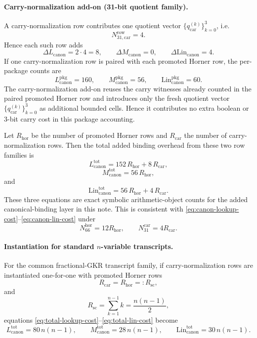 ﻿\documentclass[11pt]{article}
\begin{document}
\paragraph{Carry-normalization add-on (31-bit quotient family).}
A carry-normalization row contributes one quotient vector
\(\{q_{\mathrm{car}}^{(k)}\}_{k=0}^3\), i.e.
\[
N_{31,\mathrm{car}}^{\mathrm{row}}=4.
\]
Hence each such row adds
\[
\Delta L_{\mathrm{canon}}=2\cdot 4=8,\qquad
\Delta M_{\mathrm{canon}}=0,\qquad
\Delta \mathrm{Lin}_{\mathrm{canon}}=4.
\]
If one carry-normalization row is paired with each promoted Horner row, the
per-package counts are
\[
L_{\mathrm{canon}}^{\mathrm{pkg}}=160,\qquad
M_{\mathrm{canon}}^{\mathrm{pkg}}=56,\qquad
\mathrm{Lin}_{\mathrm{canon}}^{\mathrm{pkg}}=60.
\]
The carry-normalization add-on reuses the carry witnesses already counted in
the paired promoted Horner row and introduces only the fresh quotient vector
\(\{q_{\mathrm{car}}^{(k)}\}_{k=0}^3\) as additional bounded cells. Hence it
contributes no extra boolean or \(3\)-bit carry cost in this package
accounting.

Let \(R_{\mathrm{hor}}\) be the number of promoted Horner rows and
\(R_{\mathrm{car}}\) the number of carry-normalization rows. Then the total added
binding overhead from these two row families is
\begin{equation}
L_{\mathrm{canon}}^{\mathrm{tot}}
=
152\,R_{\mathrm{hor}}+8\,R_{\mathrm{car}},
\label{eq:total-lookup-cost}
\end{equation}
\begin{equation}
M_{\mathrm{canon}}^{\mathrm{tot}}
=
56\,R_{\mathrm{hor}},
\label{eq:total-mul-cost}
\end{equation}
and
\begin{equation}
\mathrm{Lin}_{\mathrm{canon}}^{\mathrm{tot}}
=
56\,R_{\mathrm{hor}}+4\,R_{\mathrm{car}}.
\label{eq:total-lin-cost}
\end{equation}
These three equations are exact symbolic arithmetic-object counts for the added
canonical-binding layer in this note.
This is consistent with
\eqref{eq:canon-lookup-cost}--\eqref{eq:canon-lin-cost} under
\[
N_{66}^{\mathrm{hor}}=12R_{\mathrm{hor}},
\qquad
N_{31}^{\mathrm{car}}=4R_{\mathrm{car}}.
\]

\paragraph{Instantiation for standard \(n\)-variable transcripts.}
For the common fractional-GKR transcript family, if carry-normalization rows
are instantiated one-for-one with promoted Horner rows
\[
R_{\mathrm{car}}=R_{\mathrm{hor}}=:R_{\mathrm{sc}},
\]
and
\[
R_{\mathrm{sc}}
=
\sum_{k=1}^{n-1} k
=
\frac{n(n-1)}{2},
\]
equations \eqref{eq:total-lookup-cost}--\eqref{eq:total-lin-cost} become
\[
L_{\mathrm{canon}}^{\mathrm{tot}}=80\,n(n-1),
\qquad
M_{\mathrm{canon}}^{\mathrm{tot}}=28\,n(n-1),
\qquad
\mathrm{Lin}_{\mathrm{canon}}^{\mathrm{tot}}=30\,n(n-1).
\]
\end{document}
